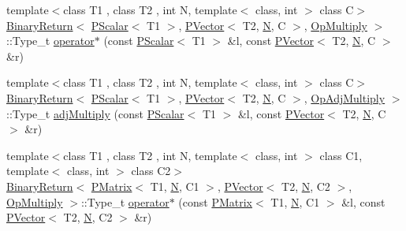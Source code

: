 \begin{DoxyCompactItemize}
\item 
{\footnotesize template$<$class T1 , class T2 , int N, template$<$ class, int $>$ class C$>$ }\\\mbox{\hyperlink{structENSEM_1_1BinaryReturn}{Binary\+Return}}$<$ \mbox{\hyperlink{classENSEM_1_1PScalar}{P\+Scalar}}$<$ T1 $>$, \mbox{\hyperlink{classENSEM_1_1PVector}{P\+Vector}}$<$ T2, \mbox{\hyperlink{operator__name__util_8cc_a7722c8ecbb62d99aee7ce68b1752f337}{N}}, C $>$, \mbox{\hyperlink{structENSEM_1_1OpMultiply}{Op\+Multiply}} $>$\+::Type\+\_\+t \mbox{\hyperlink{group__primvector_ga8312ce5cc507ffa0b4b203b976d05f47}{operator$\ast$}} (const \mbox{\hyperlink{classENSEM_1_1PScalar}{P\+Scalar}}$<$ T1 $>$ \&l, const \mbox{\hyperlink{classENSEM_1_1PVector}{P\+Vector}}$<$ T2, \mbox{\hyperlink{operator__name__util_8cc_a7722c8ecbb62d99aee7ce68b1752f337}{N}}, C $>$ \&r)
\item 
{\footnotesize template$<$class T1 , class T2 , int N, template$<$ class, int $>$ class C$>$ }\\\mbox{\hyperlink{structENSEM_1_1BinaryReturn}{Binary\+Return}}$<$ \mbox{\hyperlink{classENSEM_1_1PScalar}{P\+Scalar}}$<$ T1 $>$, \mbox{\hyperlink{classENSEM_1_1PVector}{P\+Vector}}$<$ T2, \mbox{\hyperlink{operator__name__util_8cc_a7722c8ecbb62d99aee7ce68b1752f337}{N}}, C $>$, \mbox{\hyperlink{structENSEM_1_1OpAdjMultiply}{Op\+Adj\+Multiply}} $>$\+::Type\+\_\+t \mbox{\hyperlink{group__primvector_ga8b4f68b7aa172234ddbd8490f45bb13c}{adj\+Multiply}} (const \mbox{\hyperlink{classENSEM_1_1PScalar}{P\+Scalar}}$<$ T1 $>$ \&l, const \mbox{\hyperlink{classENSEM_1_1PVector}{P\+Vector}}$<$ T2, \mbox{\hyperlink{operator__name__util_8cc_a7722c8ecbb62d99aee7ce68b1752f337}{N}}, C $>$ \&r)
\item 
{\footnotesize template$<$class T1 , class T2 , int N, template$<$ class, int $>$ class C1, template$<$ class, int $>$ class C2$>$ }\\\mbox{\hyperlink{structENSEM_1_1BinaryReturn}{Binary\+Return}}$<$ \mbox{\hyperlink{classENSEM_1_1PMatrix}{P\+Matrix}}$<$ T1, \mbox{\hyperlink{operator__name__util_8cc_a7722c8ecbb62d99aee7ce68b1752f337}{N}}, C1 $>$, \mbox{\hyperlink{classENSEM_1_1PVector}{P\+Vector}}$<$ T2, \mbox{\hyperlink{operator__name__util_8cc_a7722c8ecbb62d99aee7ce68b1752f337}{N}}, C2 $>$, \mbox{\hyperlink{structENSEM_1_1OpMultiply}{Op\+Multiply}} $>$\+::Type\+\_\+t \mbox{\hyperlink{group__primvector_gabc873d4c0d9c1d0ff8638e1674f29a72}{operator$\ast$}} (const \mbox{\hyperlink{classENSEM_1_1PMatrix}{P\+Matrix}}$<$ T1, \mbox{\hyperlink{operator__name__util_8cc_a7722c8ecbb62d99aee7ce68b1752f337}{N}}, C1 $>$ \&l, const \mbox{\hyperlink{classENSEM_1_1PVector}{P\+Vector}}$<$ T2, \mbox{\hyperlink{operator__name__util_8cc_a7722c8ecbb62d99aee7ce68b1752f337}{N}}, C2 $>$ \&r)

\end{DoxyCompactItemize}
